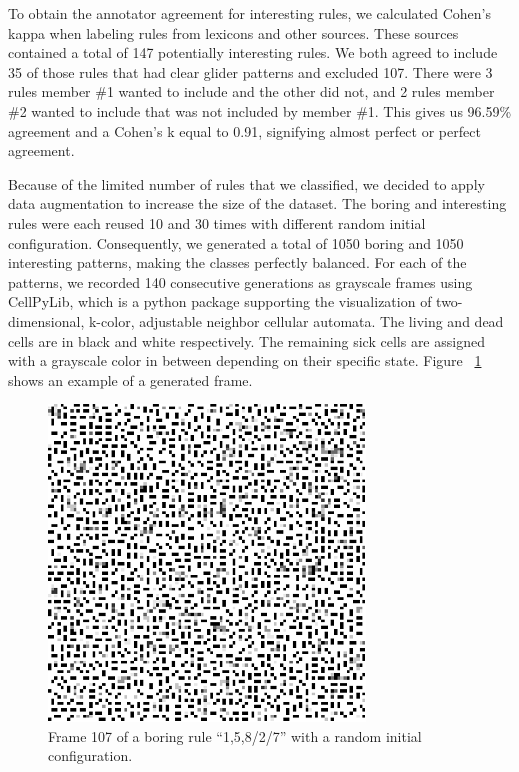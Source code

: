 \documentclass[12pt]{article}
\numberwithin{figure}{section} %
\begin{document}
To obtain the annotator agreement for interesting rules, we calculated Cohen’s kappa when labeling rules from lexicons and other sources. These sources contained a total of 147 potentially interesting rules. We both agreed to include 35 of those rules that had clear glider patterns and excluded 107. There were 3 rules member \#1 wanted to include and the other did not, and 2 rules member \#2 wanted to include that was not included by member \#1. This gives us 96.59\% agreement and a Cohen’s k equal to 0.91, signifying almost perfect or perfect agreement. 

Because of the limited number of rules that we classified, we decided to apply data augmentation to increase the size of the dataset. The boring and interesting rules were each reused 10 and 30 times with different random initial configuration. Consequently, we generated a total of 1050 boring and 1050 interesting patterns, making the classes perfectly balanced. For each of the patterns, we recorded 140 consecutive generations as grayscale frames using CellPyLib, which is a python package supporting the visualization of two-dimensional, k-color, adjustable neighbor cellular automata. The living and dead cells are in black and white respectively. The remaining sick cells are assigned with a grayscale color in between depending on their specific state. Figure ~\ref{fig:generated frame example} shows an example of a generated frame. 

\begin{figure}[H]
\centering
\includegraphics[width=0.5\linewidth]{Section3/1}
\caption{Frame 107 of a boring rule “1,5,8/2/7” with a random initial configuration. }
\vspace{-1.5em}
\label{fig:generated frame example}
\end{figure}
\end{document}
